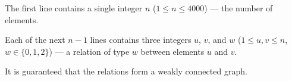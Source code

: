 The first line contains a single integer $n$ ($1 \le n \le 4000$) --- the number of elements.

Each of the next $n - 1$ lines contains three integers $u$, $v$, and $w$ ($1 \le u, v \le n$, $w \in \{0, 1, 2\}$) --- a relation of type $w$ between elements $u$ and $v$.

It is guaranteed that the relations form a weakly connected graph.
